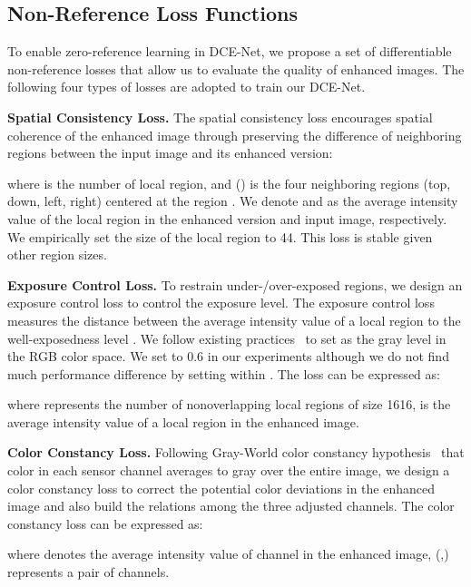 \documentclass[10pt,twocolumn,letterpaper]{article}
\begin{document}
\vspace{-5pt}
\subsection{Non-Reference Loss Functions}

To enable zero-reference learning in DCE-Net, we propose a set of differentiable non-reference losses that allow us to evaluate the quality of enhanced images.
The following four types of losses are adopted to train our DCE-Net.

\noindent
\textbf{Spatial Consistency Loss.}
The spatial consistency loss  encourages spatial coherence of the enhanced image through preserving the difference of neighboring regions between the input image and its enhanced version:

where  is the number of local region, and () is the four neighboring regions (top, down, left, right) centered at the region . We denote  and  as the average intensity value of the local region in the enhanced version and input image, respectively.
We empirically set the size of the local region to 44. This loss is stable given other region sizes.




\noindent
\textbf{Exposure Control Loss.}
To restrain under-/over-exposed regions, we design an exposure control loss  to control the exposure level.
The exposure control loss measures the distance between the average intensity value of a local region to the well-exposedness level .
We follow existing practices~\cite{Exposure2007,Exposure2009} to set  as the gray level in the RGB color space. We set  to 0.6 in our experiments although we do not find much performance difference by setting  within .
The loss  can be expressed as:

where  represents the number of nonoverlapping local regions of size 1616,  is the average intensity value of a local region in the enhanced image.


\noindent
\textbf{Color Constancy Loss.}
Following Gray-World color constancy hypothesis~\cite{Buchsbaum1980} that color in each sensor channel averages to gray over the entire image, we design a color constancy loss to correct the potential color deviations in the enhanced image and also build the relations among the three adjusted channels.
The color constancy loss  can be expressed as:

where  denotes the average intensity value of  channel in the enhanced image, (,) represents a pair of channels.
\end{document}
